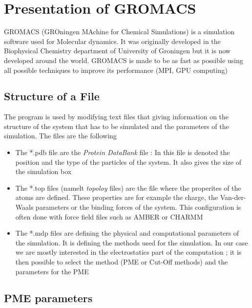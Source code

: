 \documentclass[12pt,twoside,a4paper]{report}
\begin{document}
  


\section{Presentation of GROMACS}

    GROMACS (GROningen MAchine for Chemical Simulations) is a simulation software used for Molecular dynamics. It was originally developed in the Biophysical Chemistry department of University of Groningen but it is now developed around the world. GROMACS is made to be as fast as possible using all possible techniques to improve its performance (MPI, GPU computing) 
    
   
	\subsection{Structure of a File}
	
	 The program is used  by modifying text files that giving information on the structure of the system that has to be simulated and the parameters of the simulation. The files are the following 
	 
	\begin{itemize}
	
	\item The *.pdb file are the \textit{Protein DataBank} file : In this file is denoted the position and the type of the particles of the system. It also gives the size of the simulation box

	\item The *.top files (namelt \textit{topoloy} files) are the file where the properites of the atoms are defined. These properties are for example the charge, the Van-der-Waals parameters or the binding forces of the system. This configuration is often done with force field files such as AMBER or CHARMM
		 
	\item The *.mdp files are defining the physical and computational parameters of the simulation. It is defining the methods used for the simulation. In our case we are mostly interested in the electrostatics part of the computation ; it is then possible to select the method (PME or Cut-Off methods) and the parameters for the PME
	
	\end{itemize}
		
	\subsection{PME parameters}
	
\end{document}
